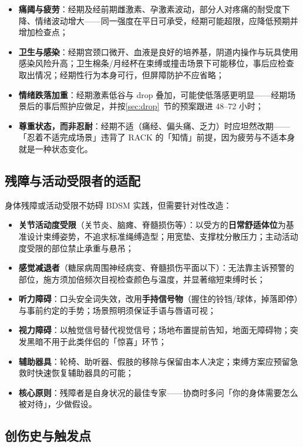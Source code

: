 \documentclass[12pt,UTF8]{ctexbook}
\begin{document}
\begin{itemize}
\item \textbf{痛阈与疲劳}：经期及经前期雌激素、孕激素波动，部分人对疼痛的耐受度下降、情绪波动增大——同一强度在平日可承受，经期可能超限，应降低预期并增加检查点；
\item \textbf{卫生与感染}：经期宫颈口微开、血液是良好的培养基，阴道内操作与玩具使用感染风险升高；卫生棉条/月经杯在束缚或撞击场景下可能移位，事后应检查取出情况；经期性行为本身可行，但屏障防护不应省略；
\item \textbf{情绪跌落加重}：经期激素低谷与 drop 叠加，可能使低落感更明显——经期场景后的事后照护应做足，并按\ref{sec:drop}~节的预案跟进 48--72 小时；
\item \textbf{尊重状态，而非忍耐}：经期不适（痛经、偏头痛、乏力）时应坦然改期——「忍着不适完成场景」违背了 RACK 的「知情」前提，因为疲劳与不适本身就是一种状态变化。
\end{itemize}

\subsection{残障与活动受限者的适配}

身体残障或活动受限不妨碍 BDSM 实践，但需要针对性改造：

\begin{itemize}
\item \textbf{关节活动度受限}（关节炎、脑瘫、脊髓损伤等）：以受方的\textbf{日常舒适体位}为基准设计束缚姿势，不追求标准绳缚造型；用宽垫、支撑枕分散压力；主动活动度受限的部位禁止承重与悬吊；
\item \textbf{感觉减退者}（糖尿病周围神经病变、脊髓损伤平面以下）：无法靠主诉预警的部位，施方须加倍频次目视检查颜色与温度，并显著缩短束缚时长；
\item \textbf{听力障碍}：口头安全词失效，改用\textbf{手持信号物}（握住的铃铛/球体，掉落即停）与事前约定的手势；场景照明须保证手语与唇语可视；
\item \textbf{视力障碍}：以触觉信号替代视觉信号；场地布置提前告知，地面无障碍物；突发黑暗不用于此类伴侣的「惊喜」环节；
\item \textbf{辅助器具}：轮椅、助听器、假肢的移除与保留由本人决定；束缚方案应预留急救时快速恢复辅助器具的可能；
\item \textbf{核心原则}：残障者是自身状况的最佳专家——协商时多问「你的身体需要怎么被对待」，少做假设。
\end{itemize}

\subsection{创伤史与触发点}
\end{document}
